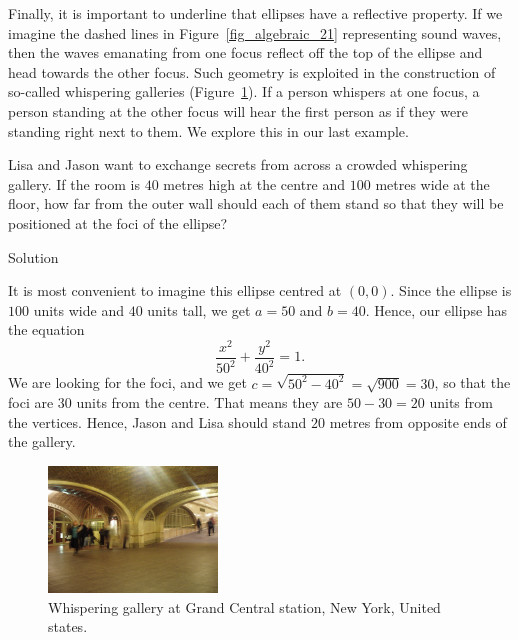 Finally, it is important to underline that  ellipses have a  reflective property. If we imagine the dashed lines in Figure~\ref{fig_algebraic_21} representing sound waves, then the waves emanating from one focus reflect off the top of the ellipse and head towards the other focus.  Such geometry is exploited in the construction of so-called whispering galleries (Figure~\ref{fig_algebraic_25}). If a person whispers at one focus, a person standing at the other focus will hear the first person as if they were standing right next to them.  We explore this in our last example. 




\begin{example} \label{whisgalleryex}
Lisa and Jason want to exchange secrets from across a crowded whispering gallery. If the room is $40$ metres high at the centre and $100$ metres wide at the floor, how far from the outer wall should each of them stand so that they will be positioned at the foci of the ellipse? 

Solution 

It is most convenient to imagine this ellipse centred at $(0,0)$.  Since the ellipse is $100$ units wide and $40$ units tall, we get $a=50$ and $b=40$.  Hence, our ellipse has the equation  
$$\frac{x^2}{50^2}+\frac{y^2}{40^2} = 1.$$
We are looking for the foci, and we get $c = \sqrt{50^2-40^2} = \sqrt{900} = 30$, so that the foci are $30$ units from the centre.  That means they are $50-30=20$ units from the vertices.  Hence, Jason and Lisa should stand $20$ metres from opposite ends of the gallery. 
\end{example}


\begin{figure}[h]
	\begin{center}
			\includegraphics[width=0.4\textwidth]{fig_algebraic_25}
	\caption{Whispering gallery at Grand Central station, New York, United states.}
	\label{fig_algebraic_25}
	\end{center}
\end{figure}
\fi


